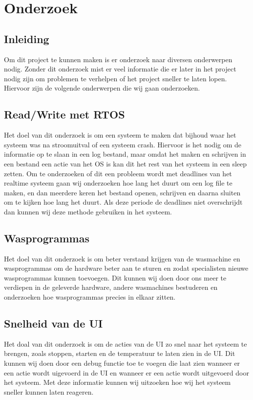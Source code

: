 \chapter{Onderzoek}
\section{Inleiding}
Om dit project te kunnen maken is er onderzoek naar diversen onderwerpen nodig. Zonder dit onderzoek mist er veel informatie die er later in het project nodig zijn om problemen te verhelpen of het project sneller te laten lopen.
Hiervoor zijn de volgende onderwerpen die wij gaan onderzoeken.

\section{Read/Write met RTOS}
Het doel van dit onderzoek is om een systeem te maken dat bijhoud waar het systeem was na stroomuitval of een systeem crash. Hiervoor is het nodig om de informatie op te slaan in een log bestand, maar omdat het maken en schrijven in een bestand een actie van het OS is kan dit het rest van het systeem in een sleep zetten. 
Om te onderzoeken of dit een probleem wordt met deadlines van het realtime systeem gaan wij onderzoeken hoe lang het duurt om een log file te maken, en dan meerdere keren het bestand openen, schrijven en daarna sluiten om te kijken hoe lang het duurt. Als deze periode de deadlines niet overschrijdt dan kunnen wij deze methode gebruiken in het systeem.

\section{Wasprogrammas}
Het doel van dit onderzoek is om beter verstand krijgen van de wasmachine en wasprogrammas om de hardware beter aan te sturen en zodat specialisten nieuwe wasprogrammas kunnen toevoegen.
Dit kunnen wij doen door ons meer te verdiepen in de geleverde hardware, andere wasmachines bestuderen en onderzoeken hoe wasprogrammas precies in elkaar zitten.

\section{Snelheid van de UI}
Het doal van dit onderzoek is om de acties van de UI zo snel naar het systeem te brengen, zoals stoppen, starten en de temperatuur te laten zien in de UI.
Dit kunnen wij doen door een debug functie toe te voegen die laat zien wanneer er een actie wordt uigevoerd in de UI en wanneer er een actie wordt uitgevoerd door het systeem. Met deze informatie kunnen wij uitzoeken hoe wij het systeem sneller kunnen laten reageren.